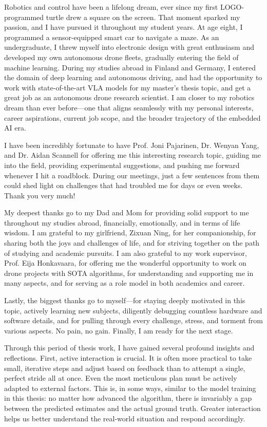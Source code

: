 \documentclass[english,12pt,a4paper,pdftex,elec,utf8]{aaltothesis}
\begin{document}
Robotics and control have been a lifelong dream, ever since my first LOGO-programmed turtle drew a square on the screen. That moment sparked my passion, and I have pursued it throughout my student years. At age eight, I programmed a sensor-equipped smart car to navigate a maze. As an undergraduate, I threw myself into electronic design with great enthusiasm and developed my own autonomous drone fleets, gradually entering the field of machine learning. During my studies abroad in Finland and Germany, I entered the domain of deep learning and autonomous driving, and had the opportunity to work with state-of-the-art VLA models for my master's thesis topic, and get a great job as an autonomous drone research scientist. I am closer to my robotics dream than ever before—one that aligns seamlessly with my personal interests, career aspirations, current job scope, and the broader trajectory of the embedded AI era.

I have been incredibly fortunate to have Prof. Joni Pajarinen, Dr. Wenyan Yang, and Dr. Aidan Scannell for offering me this interesting research topic, guiding me into the field, providing experimental suggestions, and pushing me forward whenever I hit a roadblock. During our meetings, just a few sentences from them could shed light on challenges that had troubled me for days or even weeks. Thank you very much!

My deepest thanks go to my Dad and Mom for providing solid support to me throughout my studies abroad, financially, emotionally, and in terms of life wisdom. I am grateful to my girlfriend, Zixuan Ning, for her companionship, for sharing both the joys and challenges of life, and for striving together on the path of studying and academic pursuits. I am also grateful to my work supervisor, Prof. Eija Honkavaara, for offering me the wonderful opportunity to work on drone projects with SOTA algorithms, for understanding and supporting me in many aspects, and for serving as a role model in both academics and career.

Lastly, the biggest thanks go to myself—for staying deeply motivated in this topic, actively learning new subjects, diligently debugging countless hardware and software details, and for pulling through every challenge, stress, and torment from various aspects. No pain, no gain. Finally, I am ready for the next stage.

Through this period of thesis work, I have gained several profound insights and reflections. First, active interaction is crucial. It is often more practical to take small, iterative steps and adjust based on feedback than to attempt a single, perfect stride all at once. Even the most meticulous plan must be actively adapted to external factors. This is, in some ways, similar to the model training in this thesis: no matter how advanced the algorithm, there is invariably a gap between the predicted estimates and the actual ground truth. Greater interaction helps us better understand the real-world situation and respond accordingly.
\end{document}
